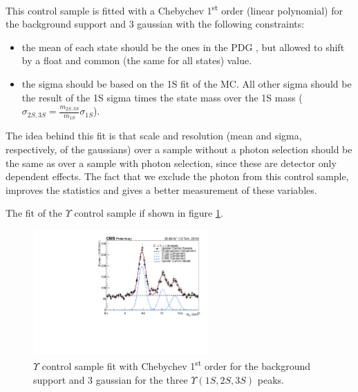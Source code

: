 This control sample is fitted with a Chebychev 1\textsuperscript{st} order (linear polynomial) for the background support and 3 gaussian with the following constraints:

\begin{itemize}
  \item the mean of each state should be the ones in the PDG \cite{Patrignani:2016xqp}, but allowed to shift by a float and common (the same for all states) value.
  \item the sigma should be based on the 1S fit of the MC. All other sigma should be the result of the 1S sigma times the state mass over the 1S mass ($\sigma_{2S,3S} = \frac{m_{2S,3S}}{m_{1S}} \sigma_{1S}$).
\end{itemize}

The idea behind this fit is that scale and resolution (mean and sigma, respectively, of the gaussians) over a sample without a photon selection should be the same as over a sample with photon selection, since these are detector only dependent effects. The fact that we exclude the photon from this control sample, improves the statistics and gives a better measurement of these variables.

The fit of the $\Upsilon$ control sample if shown in figure \ref{fig:upsilon_control_Fit}.


\begin{figure}[!htbp]
\begin{center}

\includegraphics[width=0.60\textwidth]{figures_and_tables/fitPlotFiles2D/UpsilonControlSample/upsilonControlSample_ZToUpsilonPhoton_Cat0}

\end{center}\vspace*{-.5cm}

\caption{$\Upsilon$ control sample fit with Chebychev 1\textsuperscript{st} order for the background support and 3 gaussian for the three $\Upsilon(1S,2S,3S)$ peaks.}
\label{fig:upsilon_control_Fit}
\end{figure}


